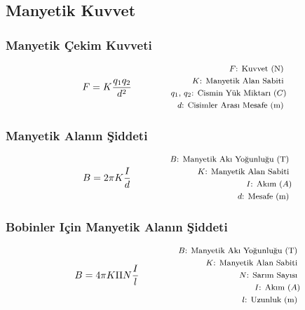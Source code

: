 \subsection{Manyetik Kuvvet}

\subsubsection*{Manyetik Çekim Kuvveti}
\begin{equation}
    F = K\frac{q_1 q_2}{d^2} \qquad \qquad \parbox{4cm}{\footnotesize$\begin{aligned}
        F\text{: Kuvvet (N) } \\
        K\text{: Manyetik Alan Sabiti } \\
        q_1\text{, }q_2\text{: Cismin Yük Miktarı } (C) \\
        d\text{: Cisimler Arası Mesafe (m) }
\end{aligned}$}
\end{equation}

\subsubsection*{Manyetik Alanın Şiddeti}
\begin{equation}
    B = 2\pi K \frac{I}{d} \qquad \qquad \parbox{4cm}{\footnotesize$\begin{aligned}
        B\text{: Manyetik Akı Yoğunluğu (T) } \\
        K\text{: Manyetik Alan Sabiti } \\
        I\text{: Akım } (A) \\
        d\text{: Mesafe (m) }
\end{aligned}$}
\end{equation}

\subsubsection*{Bobinler Için Manyetik Alanın Şiddeti}
\begin{equation}
    B = 4\pi K \Pi N \frac{I}{l} \qquad \qquad \parbox{4cm}{\footnotesize$\begin{aligned}
        B\text{: Manyetik Akı Yoğunluğu (T) } \\
        K\text{: Manyetik Alan Sabiti } \\
        N\text{: Sarım Sayısı } \\
        I\text{: Akım } (A) \\
        l\text{: Uzunluk (m) }
\end{aligned}$}
\end{equation}

